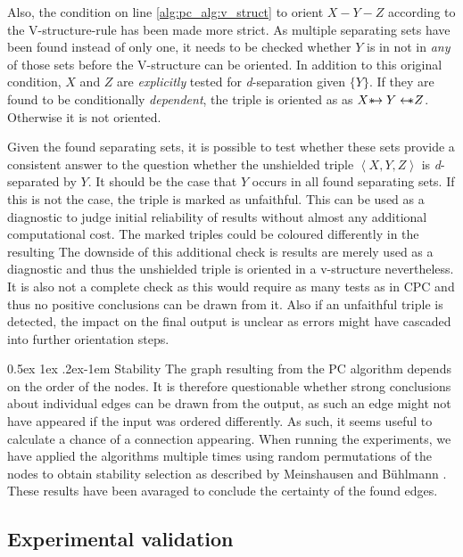 \documentclass[a4paper, 10pt, english, onecolumn]{article}
\makeatletter
\def \srightarrow {\text{\textasteriskcentered}\hspace{-0.62em}\rightarrow}
\def \sleftarrow {\leftarrow\hspace{-0.62em}\text{\textasteriskcentered}}
\renewcommand{\paragraph}{%
  \@startsection{paragraph}{4}%
  {\z@}{0.5ex \@plus 1ex \@minus .2ex}{-1em}%
  {\normalfont\normalsize\bfseries}%
}
\makeatother
\begin{document}
Also, the condition on line \ref{alg:pc_alg:v_struct} to orient $X - Y - Z$ according to the V-structure-rule has been made more strict.
As multiple separating sets have been found instead of only one, it needs to be checked whether $Y$ is in not in \emph{any} of those sets before the V-structure can be oriented.
In addition to this original condition, $X$ and $Z$ are \textit{explicitly} tested for \textit{d}-separation given $\{Y\}$.
If they are found to be conditionally \textit{dependent}, the triple is oriented as as $X \srightarrow Y \sleftarrow Z$.
Otherwise it is not oriented.

Given the found separating sets, it is possible to test whether these sets provide a consistent answer to the question whether the unshielded triple $\left<X,Y,Z\right>$ is \textit{d}-separated by $Y$.
It should be the case that $Y$ occurs in all found separating sets.
If this is not the case, the triple is marked as unfaithful.
This can be used as a diagnostic to judge initial reliability of results without almost any additional computational cost.
The marked triples could be coloured differently in the resulting 
The downside of this additional check is results are merely used as a diagnostic and thus the unshielded triple is oriented in a v-structure nevertheless.
It is also not a complete check as this would require as many tests as in CPC and thus no positive conclusions can be drawn from it.
Also if an unfaithful triple is detected, the impact on the final output is unclear as errors might have cascaded into further orientation steps.

\paragraph{Stability}
The graph resulting from the PC algorithm depends on the order of the nodes\cite[p.120-122]{spirtes2000}.
It is therefore questionable whether strong conclusions about individual edges can be drawn from the output, as such an edge might not have appeared if the input was ordered differently.
As such, it seems useful to calculate a chance of a connection appearing.
When running the experiments, we have applied the algorithms multiple times using random permutations of the nodes to obtain stability selection as described by Meinshausen and B{\"u}hlmann \cite{meinshausen2010}.
These results have been avaraged to conclude the certainty of the found edges.

\subsection{Experimental validation}
\end{document}

